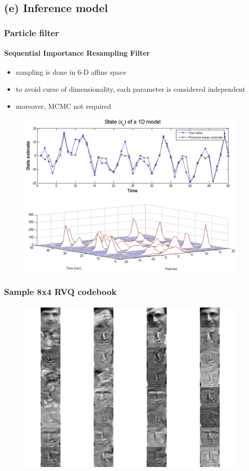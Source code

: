 \subsection{(e) Inference model}
\begin{frame}
\frametitle{Particle filter}
\framesubtitle{Sequential Importance Resampling Filter}
\logoCSIPCPL\mypagenum
\begin{itemize}
\item sampling is done in 6-D affine space
\item to avoid curse of dimensionality, each parameter is considered independent
\item moreover, MCMC not required
\end{itemize}
\begin{figure}
\includegraphics[width=1.0\textwidth]{thesis/TRK_ParticleFilter_multimodalPDF.pdf}
\end{figure}	
\end{frame}




\begin{frame}
\frametitle{Sample 8x4 RVQ codebook}
\framesubtitle{}
\logoCSIPCPL\mypagenum
\begin{figure}
\includegraphics[height=0.75\textheight]{thesis/1_Dudek__aRVQ_08_04_1000_0_RofE__170_codebook.pdf}
\end{figure}	
\end{frame}

